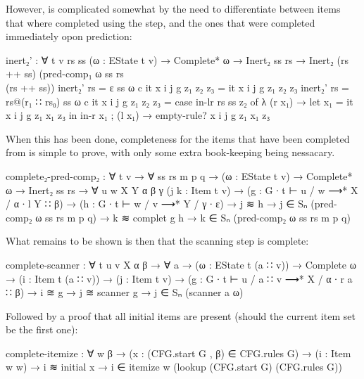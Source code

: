 		However,  is complicated somewhat by the need to
		differentiate between items that where completed using the
		 step, and the ones that were completed immediately opon
		prediction:

		\begin{code}
			inert₂' : ∀ {t v rs ss} (ω : EState t v) →
			  Complete* ω →
			  Inert₂ ss rs →
			  Inert₂ (rs ++ ss) (pred-comp₁ ω ss rs \\ (rs ++ ss))
			inert₂' {rs = ε} {ss} ω c it x i j g z₁ z₂ z₃ = it x i j g z₁ z₂ z₃
			inert₂' {rs = rs@(r₁ ∷ rs₀)} {ss} ω c it x i j g z₁ z₂ z₃ =
			  case in-lr rs ss z₂ of
			    λ { (r x₁) →
			      let x₁ = it x i j g z₁ x₁ z₃  in
			      in-r x₁
			    ; (l x₁) → empty-rule? x i j g z₁ x₁ z₃
			    }
		\end{code}

		When this has been done, completeness for the items that have been
		completed from  is simple to prove, with only some
		extra book-keeping being nessacary.

		\begin{code}
			complete₂-pred-comp₂ : ∀ {t v} → ∀ ss rs m p q →
			  (ω : EState t v) →
			  Complete* ω →
			  Inert₂ ss rs →
			  ∀ {u w X Y α β γ}
			  (j k : Item t v) →
			  (g : G ∙ t ⊢ u / w ⟶* X / α ∙ l Y ∷ β) →
			  (h : G ∙ t ⊢ w / v ⟶* Y / γ ∙ ε) →
			  j ≋ h → j ∈ Sₙ (pred-comp₂ ω ss rs m p q) →
			  k ≋ complet g h →
			    k ∈ Sₙ (pred-comp₂ ω ss rs m p q)
		\end{code}

		What remains to be shown is then that the scanning step is complete:

		\begin{code}
			complete-scanner : ∀ {t u v X α β} → ∀ a →
			  (ω : EState t (a ∷ v)) →
			  Complete ω →
			  (i : Item t (a ∷ v)) →
			  (j : Item t v) →
			  (g : G ∙ t ⊢ u / a ∷ v ⟶* X / α ∙ r a ∷ β) →
			  i ≋ g →
			  j ≋ scanner g →
			    j ∈ Sₙ (scanner a ω)
		\end{code}

		Followed by a proof that all initial items are present (should the
		current item set be the first one):

		\begin{code}
			complete-itemize : ∀ w {β} →
			  (x : (CFG.start G , β) ∈ CFG.rules G) →
			  (i : Item w w) →
			  i ≋ initial x →
			    i ∈ itemize w (lookup (CFG.start G) (CFG.rules G))
		\end{code}

